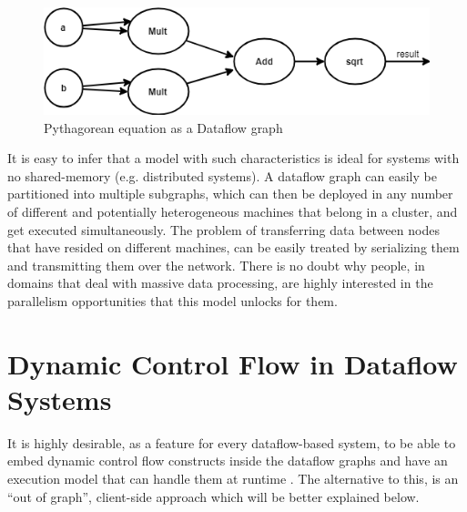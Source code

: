 \documentclass[ack,preface]{dithesis}
\begin{document}
\begin{figure}
\centering
\includegraphics[scale=0.7]{figures/dataflowExample}
\caption{ Pythagorean equation as a Dataflow graph}
\end{figure}

It is easy to infer that a model with such characteristics is ideal for systems with no shared-memory (e.g. distributed systems). A dataflow graph can easily be partitioned into multiple subgraphs, which can then be deployed in any number of different and potentially heterogeneous machines that belong in a cluster, and get executed simultaneously. The problem of transferring data between nodes that have resided on different machines, can be easily treated by serializing them and transmitting them over the network.
There is no doubt why people, in domains that deal with massive data processing, are highly interested in the parallelism opportunities that this model unlocks for them. \\
\linebreak\linebreak\linebreak\linebreak\linebreak\linebreak


    \section{Dynamic Control Flow in Dataflow Systems}
It is highly desirable, as a feature for every dataflow-based system, to be able to embed dynamic control flow constructs inside the dataflow graphs and have an execution model  that  can handle them at runtime \cite{Yu:2018}. The alternative to this, is an “out of graph”, client-side approach which will be better explained below.
\end{document}
